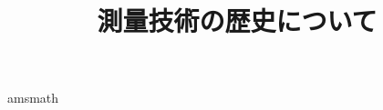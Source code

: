 \documentclass[titlepage,a4paper]{jsarticle}
\begin{document}
\title{測量技術の歴史について}
\expdate{\date}
\maketitle
amsmath
\end{document}
